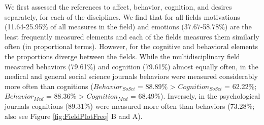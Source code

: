 We first assessed the references to affect, behavior, cognition, and
desires separately, for each of the disciplines. We find that for all
fields motivations (11.64-25.95\% of all measures in the field) and
emotions (37.67-58.78\%) are the least frequently measured elements and
each of the fields measures them similarly often (in proportional
terms). However, for the cognitive and behavioral elements the
proportions diverge between the fields. While the multidisciplinary
field measured behaviors (79.61\%) and cognition (79.61\%) almost
equally often, in the medical and general social science journals
behaviors were measured considerably more often than cognitions
(\(Behavior_{SoSci}\) = 88.89\% \textgreater{} \(Cognition_{SoSci}\) =
62.22\%; \(Behavior_{Med}\) = 88.36\% \textgreater{} \(Cognition_{Med}\)
= 68.49\%). Inversely, in the psychological journals cognitions
(89.31\%) were measured more often than behaviors (73.28\%; also see
Figure \ref{fig:FieldPlotFreq} B and A).

